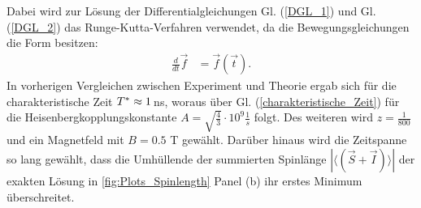 Dabei wird zur Lösung der Differentialgleichungen Gl. (\ref{DGL_1}) und Gl. (\ref{DGL_2}) das Runge-Kutta-Verfahren verwendet, da die 
Bewegungsgleichungen die Form besitzen:
\begin{align}
    \frac{d}{dt}\vec{f} &= \vec{f}(\vec{t}) .
\end{align}
In vorherigen Vergleichen zwischen Experiment und Theorie ergab sich für die charakteristische Zeit $T^*\approx 1 \thinspace$ns\cite{PhysRevB.89.045317}, 
woraus über Gl. (\ref{charakteristische_Zeit}) für die Heisenbergkopplungskonstante $A = \sqrt{\frac{4}{3}}\cdot 10^9 \frac{1}{s}$ folgt. Des weiteren wird
$z=\frac{1}{800}$ und ein Magnetfeld mit $B = 0.5$ T gewählt. Darüber hinaus wird die Zeitspanne so lang gewählt, dass die Umhüllende der 
summierten Spinlänge $|\langle \left( \vec{S}+\vec{I} \right)\rangle |$  der exakten Lösung in \autoref{fig:Plots_Spinlength} Panel (b) ihr erstes Minimum 
überschreitet.
